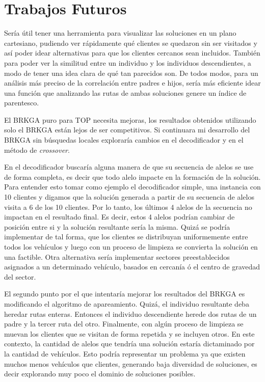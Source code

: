\section{Trabajos Futuros}

Sería útil tener una herramienta para visualizar las soluciones en un plano cartesiano, pudiendo ver rápidamente qué clientes se quedaron sin ser visitados y así poder idear alternativas para que los clientes cercanos sean incluidos. También para poder ver la similitud entre un individuo y los individuos descendientes, a modo de tener una idea clara de qué tan parecidos son. De todos modos, para un análisis más preciso de la correlación entre padres e hijos, sería más eficiente idear una función que analizando las rutas de ambas soluciones genere un índice de parentesco.

\bigskip

El BRKGA puro para TOP necesita mejoras, los resultados obtenidos utilizando solo el BRKGA están lejos de ser competitivos. Si continuara mi desarrollo del BRKGA sin búsquedas locales exploraría cambios en el decodificador y en el método de \textit{crossover}. 

\bigskip

En el decodificador buscaría alguna manera de que su secuencia de alelos se use de forma completa, es decir que todo alelo impacte en la formación de la solución. Para entender esto tomar como ejemplo el decodificador simple, una instancia con 10 clientes y digamos que la solución generada a partir de su secuencia de alelos visita a 6 de los 10 clientes. Por lo tanto, los últimos 4 alelos de la secuencia no impactan en el resultado final. Es decir, estos 4 alelos podrían cambiar de posición entre si y la solución resultante sería la misma. Quizá se podría implementar de tal forma, que los clientes se distribuyan uniformemente entre todos los vehículos y luego con un proceso de limpieza se convierta la solución en una factible. Otra alternativa sería implementar sectores preestablecidos asignados a un determinado vehículo, basados en cercanía ó el centro de gravedad del sector.

\bigskip

El segundo punto por el que intentaría mejorar los resultados del BRKGA es modificando el algoritmo de apareamiento. Quizá, el individuo resultante deba heredar rutas enteras. Entonces el individuo descendiente herede dos rutas de un padre y la tercer ruta del otro. Finalmente, con algún proceso de limpieza se muevan los clientes que se visitan de forma repetida y se incluyen otros. En este contexto, la cantidad de alelos que tendría una solución estaría dictaminado por la cantidad de vehículos. Esto podría representar un problema ya que existen muchos menos vehículos que clientes, generando baja diversidad de soluciones, es decir explorando muy poco el dominio de soluciones posibles.

